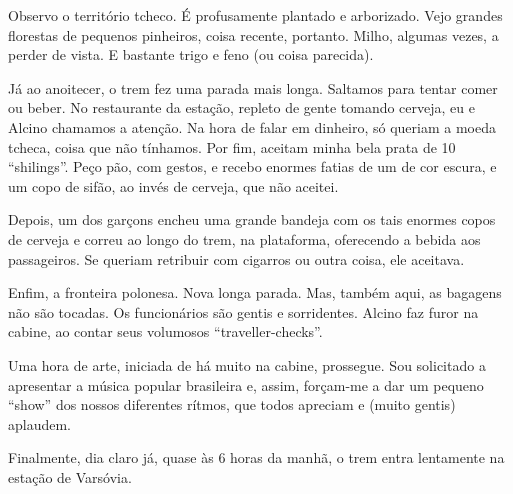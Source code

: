 Observo o território tcheco. É profusamente plantado e arborizado. Vejo grandes florestas de pequenos pinheiros, coisa recente, portanto. Milho, algumas vezes, a perder de vista. E bastante trigo e feno (ou coisa parecida).

Já ao anoitecer, o trem fez uma parada mais longa. Saltamos para tentar comer ou beber. No restaurante da estação, repleto de gente tomando cerveja, eu e Alcino chamamos a atenção. Na hora de falar em dinheiro, só queriam a moeda tcheca, coisa que não tínhamos. Por fim, aceitam minha bela prata de 10 ``shilings''. Peço pão, com gestos, e recebo enormes fatias de um de cor escura, e um copo de sifão, ao invés de cerveja, que não aceitei.

Depois, um dos garçons encheu uma grande bandeja com os tais enormes copos de cerveja e correu ao longo do trem, na plataforma, oferecendo a bebida aos passageiros. Se queriam retribuir com cigarros ou outra coisa, ele aceitava.

Enfim, a fronteira polonesa. Nova longa parada. Mas, também aqui, as bagagens não são tocadas. Os funcionários são gentis e sorridentes. Alcino faz furor na cabine, ao contar seus volumosos ``traveller-checks''.

Uma hora de arte, iniciada de há muito na cabine, prossegue. Sou solicitado a apresentar a música popular brasileira e, assim, forçam-me a dar um pequeno ``show'' dos nossos diferentes rítmos, que todos apreciam e (muito gentis) aplaudem.

Finalmente, dia claro já, quase às 6 horas da manhã, o trem entra lentamente na estação de Varsóvia.
